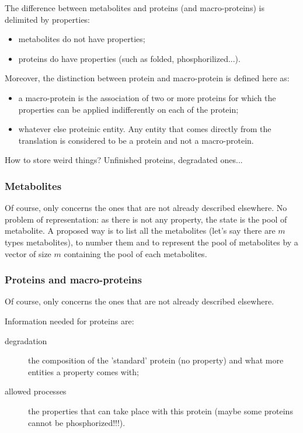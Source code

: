 The difference between metabolites and proteins (and macro-proteins) is delimited by properties:
\begin{itemize}
  \item metabolites do not have properties;
  \item proteins do have properties (such as folded, phosphorilized...).
\end{itemize}
Moreover, the distinction between protein and macro-protein is defined here as:
\begin{itemize}
  \item a macro-protein is the association of two or more proteins for which the properties can be applied indifferently on each of the protein;
  \item whatever else proteinic entity. Any entity that comes directly from the translation is considered to be a protein and not a macro-protein.
\end{itemize}

\textcolor[rgb]{0.00,0.00,0.00}{How to store weird things? Unfinished proteins, degradated ones...}


\subsubsection{Metabolites}
Of course, only concerns the ones that are not already described elsewhere. No problem of representation: as there is not any property, the state is the pool of metabolite. A proposed way is to list all the metabolites (let's say there are $m$ types metabolites), to number them and to represent the pool of metabolites by a vector of size $m$ containing the pool of each metabolites.

\subsubsection{Proteins and macro-proteins}
Of course, only concerns the ones that are not already described elsewhere.

\medskip

Information needed for proteins are:
\begin{description}
  \item[degradation] the composition of the 'standard' protein (no property) and what more entities a property comes with;
  \item[allowed processes] the properties that can take place with this protein (maybe some proteins cannot be phosphorized!!!).
\end{description}

